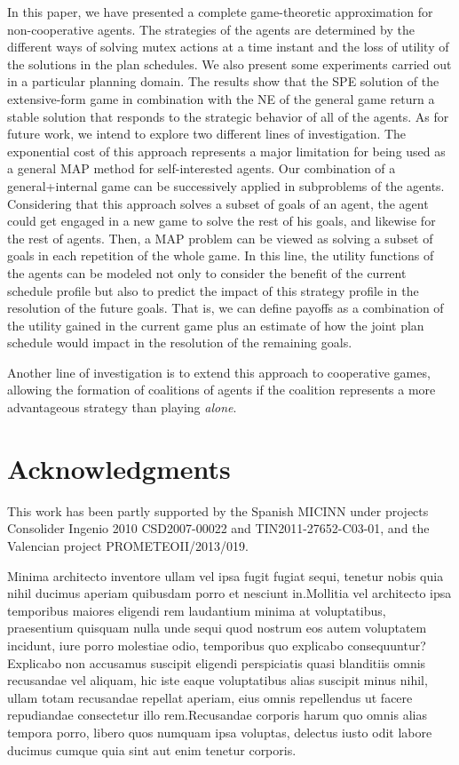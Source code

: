 \documentclass[letterpaper]{article}
\begin{document}
In this paper, we have presented a complete game-theoretic approximation for non-cooperative agents. The strategies of the agents are determined by the different ways of solving mutex actions at a time instant and the loss of utility of the solutions in the plan schedules. We also present some experiments carried out in a particular planning domain. The results show that the SPE solution of the extensive-form game in combination with the NE of the general game return a stable solution that responds to the strategic behavior of all of the agents.  As for future work, we intend to explore two different lines of investigation. The exponential cost of this approach represents a major limitation for being used as a general MAP method for self-interested agents. Our combination of a general+internal game can be successively applied in subproblems of the agents. Considering that this approach solves a subset of goals of an agent, the agent could get engaged in a new game to solve the rest of his goals, and likewise for the rest of agents. Then, a MAP problem can be viewed as solving a subset of goals in each repetition of the whole game. In this line, the utility functions of the agents can be modeled not only to consider the benefit of the current schedule profile but also to predict the impact of this strategy profile in the resolution of the future goals. That is, we can define payoffs as a combination of the utility gained in the current game plus an estimate of how the joint plan schedule would impact in the resolution of the remaining goals.

Another line of investigation is to extend this approach to cooperative games, allowing the formation of coalitions of agents if the coalition represents a more advantageous strategy than playing \emph{alone}.

\vspace{-0.84mm}
\vspace{-1.57mm}
\section*{ Acknowledgments}
This work has been partly supported by the Spanish MICINN under projects Consolider Ingenio 2010 CSD2007-00022 and TIN2011-27652-C03-01, and the Valencian project PROMETEOII/2013/019.




  Minima architecto inventore ullam vel ipsa fugit fugiat sequi, tenetur nobis quia nihil ducimus aperiam quibusdam porro et nesciunt in.Mollitia vel architecto ipsa temporibus maiores eligendi rem laudantium minima at voluptatibus, praesentium quisquam nulla unde sequi quod nostrum eos autem voluptatem incidunt, iure porro molestiae odio, temporibus quo explicabo consequuntur?Explicabo non accusamus suscipit eligendi perspiciatis quasi blanditiis omnis recusandae vel aliquam, hic iste eaque voluptatibus alias suscipit minus nihil, ullam totam recusandae repellat aperiam, eius omnis repellendus ut facere repudiandae consectetur illo rem.Recusandae corporis harum quo omnis alias tempora porro, libero quos numquam ipsa voluptas, delectus iusto odit labore ducimus cumque quia sint aut enim tenetur corporis.\clearpage

\end{document}
